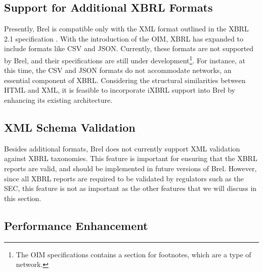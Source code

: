 \subsection{Support for Additional XBRL Formats}

Presently, Brel is compatible only with the XML format outlined in the XBRL 2.1 specification \cite{xbrl21}.
With the introduction of the OIM, XBRL has expanded to include formats like CSV and JSON.
Currently, these formats are not supported by Brel, and their specifications are still under development\footnote{The OIM specifications contains a section for footnotes, which are a type of network.}.
For instance, at this time, the CSV and JSON formats do not accommodate networks, an essential component of XBRL.
Considering the structural similarities between HTML and XML, it is feasible to incorporate iXBRL support into Brel by enhancing its existing architecture.

\subsection{XML Schema Validation}

Besides additional formats, Brel does not currently support XML validation against XBRL taxonomies.
This feature is important for ensuring that the XBRL reports are valid, and should be implemented in future versions of Brel.
However, since all XBRL reports are required to be validated by regulators such as the SEC, this feature is not as important as the other features that we will discuss in this section.



\subsection{Performance Enhancement}

